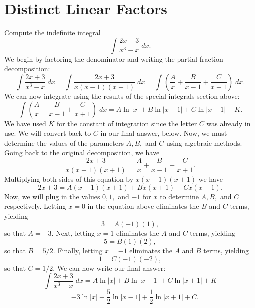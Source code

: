 \documentclass{ximera}
\begin{document}
\section{Distinct Linear Factors}



\begin{example}[example 5]

Compute the indefinite integral
\[
\int \frac{2x+3}{x^3 -x} \; dx.
\]
We begin by factoring the denominator and writing the partial fraction decomposition:
\[
\int \frac{2x+3}{x^3 -x} \; dx = \int \frac{2x+3}{x(x-1)(x+1)} \; dx = \int \left( \frac{A}{x} + \frac{B}{x-1} + \frac{C}{x+1} \right) \; dx.
\]
We can now integrate using the results of the special integrals section above:
\[
\int \left( \frac{A}{x} + \frac{B}{x-1} + \frac{C}{x+1} \right) \; dx = A\ln|x| + B\ln|x-1| + C\ln|x+1| + K.
\]
We have used $K$ for the constant of integration since the letter $C$ was already in use.  We will convert back to $C$ in our final answer, below.
Now, we must determine the values of the parameters $A, B, $ and $C$ using algebraic methods.
Going back to the original decomposition, we have
\[
\frac{2x+3}{x(x-1)(x+1)} = \frac{A}{x}  + \frac{B}{x-1} + \frac{C}{x+1}.
\]
Multiplying both sides of this equation by $x(x-1)(x+1)$ we have
\[
2x+3 = A(x-1)(x+1) + Bx(x+1) + Cx(x-1).
\]
Now, we will plug in the values $0, 1, $ and $-1$ for $x$ to determine $A, B, $ and $C$ respectively.
Letting $x = 0$ in the equation above eliminates the $B$ and $C$ terms, yielding
\[
3 = A(-1)(1),
\]
so that $A = -3$.
Next, letting $x = 1$ eliminates the $A$ and $C$ terms, yielding
\[
5 = B(1)(2),
\]
so that $B = 5/2$. Finally, letting $x = -1$ eliminates the $A$ and $B$ terms, yielding
\[
1 = C(-1)(-2),
\]
so that $C = 1/2$.
We can now write our final answer:
\[
\int \frac{2x+3}{x^3 -x} \; dx = A\ln|x| + B\ln|x-1| + C\ln|x+1| + K
\]
\[
 = -3\ln|x| + \frac52 \ln|x-1| + \frac12 \ln|x+1| + C.
\]

\end{example}



\begin{center}
\begin{foldable}
\end{foldable}
\end{center}
\end{document}
